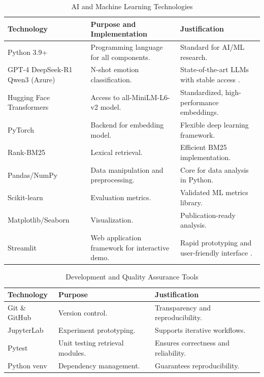 \begin{table}[H]
\centering
\caption{AI and Machine Learning Technologies}
\label{tab:ai_ml_tools}
\begin{tabular}{@{}p{4cm} p{5.5cm} p{5.5cm}@{}}
\toprule
\textbf{Technology} & \textbf{Purpose and Implementation} & \textbf{Justification} \\
\midrule
Python 3.9+ & Programming language for all components. & Standard for AI/ML research. \\
\addlinespace[0.3em]
GPT-4 DeepSeek-R1 Qwen3 (Azure) & N-shot emotion classification. & State-of-the-art LLMs with stable access \cite{openai2023gpt4}. \\
\addlinespace[0.3em]
Hugging Face Transformers & Access to all-MiniLM-L6-v2 model. & Standardized, high-performance embeddings. \\
\addlinespace[0.3em]
PyTorch & Backend for embedding model. & Flexible deep learning framework. \\
\addlinespace[0.3em]
Rank-BM25 & Lexical retrieval. & Efficient BM25 implementation. \\
\addlinespace[0.3em]
Pandas/NumPy & Data manipulation and preprocessing. & Core for data analysis in Python. \\
\addlinespace[0.3em]
Scikit-learn & Evaluation metrics. & Validated ML metrics library. \\
\addlinespace[0.3em]
Matplotlib/Seaborn & Visualization. & Publication-ready analysis. \\
\addlinespace[0.3em]
Streamlit & Web application framework for interactive demo. & Rapid prototyping and user-friendly interface \cite{streamlit2019}. \\
\bottomrule
\end{tabular}
\end{table}

\begin{table}[H]
\centering
\caption{Development and Quality Assurance Tools}
\label{tab:dev_tools}
\begin{tabular}{@{}p{4cm} p{5.5cm} p{5.5cm}@{}}
\toprule
\textbf{Technology} & \textbf{Purpose} & \textbf{Justification} \\
\midrule
Git \& GitHub & Version control. & Transparency and reproducibility. \\
JupyterLab & Experiment prototyping. & Supports iterative workflows. \\
Pytest & Unit testing retrieval modules. & Ensures correctness and reliability. \\
Python venv & Dependency management. & Guarantees reproducibility. \\
\bottomrule
\end{tabular}
\end{table}

